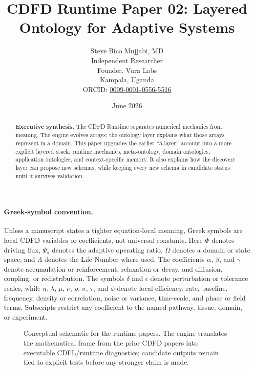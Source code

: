 \documentclass[12pt,a4paper]{article}
\title{\textbf{CDFD Runtime Paper 02: Layered Ontology for Adaptive Systems}}
\author{Steve Bico Mujjabi, MD\\
\small Independent Researcher\\
\small Founder, Vura Labs\\
\small Kampala, Uganda\\
\small ORCID: \href{https://orcid.org/0009-0001-0556-5516}{0009-0001-0556-5516}}
\date{June 2026}
\begin{document}
\maketitle

\begin{abstract}
\noindent \textbf{Executive synthesis.} The CDFD Runtime separates numerical
mechanics from meaning. The engine evolves arrays; the ontology layer explains
what those arrays represent in a domain. This paper upgrades the earlier
``5-layer'' account into a more explicit layered stack: runtime mechanics,
meta-ontology, domain ontologies, application ontologies, and context-specific
memory. It also explains how the discovery layer can propose new schemas, while
keeping every new schema in candidate status until it survives validation.
\end{abstract}

\paragraph{Greek-symbol convention.}
Unless a manuscript states a tighter equation-local meaning, Greek symbols are local CDFD variables or coefficients, not universal constants. Here $\Phi$ denotes driving flux, $\Psi_s$ denotes the adaptive operating ratio, $\Omega$ denotes a domain or state space, and $\Lambda$ denotes the Life Number where used. The coefficients $\alpha$, $\beta$, and $\gamma$ denote accumulation or reinforcement, relaxation or decay, and diffusion, coupling, or redistribution. The symbols $\delta$ and $\epsilon$ denote perturbation or tolerance scales, while $\eta$, $\lambda$, $\mu$, $\nu$, $\rho$, $\sigma$, $\tau$, and $\phi$ denote local efficiency, rate, baseline, frequency, density or correlation, noise or variance, time-scale, and phase or field terms. Subscripts restrict any coefficient to the named pathway, tissue, domain, or experiment.


\begin{figure}[ht]
\centering
{}
\caption{Conceptual schematic for the runtime papers. The engine translates the mathematical frame from the prior CDFD papers into executable CDFL/runtime diagnostics; candidate outputs remain tied to explicit tests before any stronger claim is made.}
\end{figure}
\end{document}
